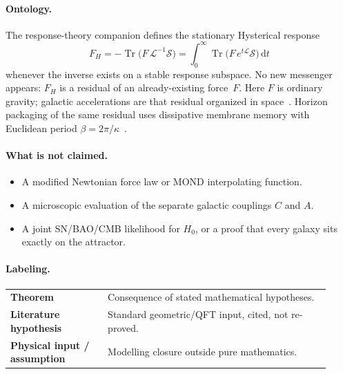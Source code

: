 \documentclass[11pt]{article}
\theoremstyle{definition}
\theoremstyle{remark}
\newcommand{\dd}{\mathrm{d}}
\newcommand{\Tr}{\operatorname{Tr}}
\newcommand{\FH}{F_H}
\begin{document}
\paragraph{Ontology.}
The response-theory companion defines the stationary Hysterical response~\cite{boyd2026response}
\begin{equation}
\label{eq:FH}
\FH=-\Tr\!\bigl(F\,\mathcal L^{-1}\mathcal S\bigr)
=\int_0^\infty\Tr\!\bigl(F\,e^{t\mathcal L}\mathcal S\bigr)\,\dd t
\end{equation}
whenever the inverse exists on a stable response subspace.
No new messenger appears: $\FH$ is a residual of an already-existing force~$F$.
Here $F$ is ordinary gravity; galactic accelerations are that residual organized in space~\cite{boyd2026galactic}.
Horizon packaging of the same residual uses dissipative membrane memory with Euclidean
period $\beta=2\pi/\kappa$~\cite{boyd2026horizon,Hawking1975,Unruh1976}.

\paragraph{What is not claimed.}
\begin{itemize}
\item A modified Newtonian force law or MOND interpolating function.
\item A microscopic evaluation of the separate galactic couplings $C$ and $A$.
\item A joint SN/BAO/CMB likelihood for $H_0$, or a proof that every galaxy sits exactly
on the attractor.
\end{itemize}

\paragraph{Labeling.}
\begin{center}
\begin{tabular}{>{\bfseries}p{0.28\linewidth}p{0.64\linewidth}}
Theorem & Consequence of stated mathematical hypotheses.\\
Literature hypothesis & Standard geometric/QFT input, cited, not re-proved.\\
Physical input / assumption & Modelling closure outside pure mathematics.\\
\end{tabular}
\end{center}
\end{document}
